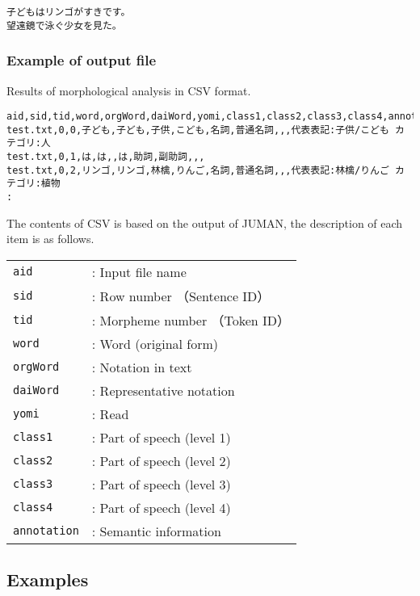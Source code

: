 \begin{Verbatim}[baselinestretch=0.7,frame=single]
子どもはリンゴがすきです。
望遠鏡で泳ぐ少女を見た。
\end{Verbatim}


\subsubsection*{Example of output file }
Results of morphological analysis in CSV format.


\begin{Verbatim}[baselinestretch=0.7,frame=single]
aid,sid,tid,word,orgWord,daiWord,yomi,class1,class2,class3,class4,annotation
test.txt,0,0,子ども,子ども,子供,こども,名詞,普通名詞,,,代表表記:子供/こども カテゴリ:人
test.txt,0,1,は,は,,は,助詞,副助詞,,,
test.txt,0,2,リンゴ,リンゴ,林檎,りんご,名詞,普通名詞,,,代表表記:林檎/りんご カテゴリ:植物
:
\end{Verbatim}
The contents of CSV is based on the output of JUMAN, the description of each item is as follows.  

\begin{table}[htbp]
{\small
\begin{tabular}{ll}
\verb|aid|        & : Input file name \\
\verb|sid|        & : Row number （Sentence ID） \\
\verb|tid|        & : Morpheme number （Token ID） \\
\verb|word|       & : Word (original form)   \\
\verb|orgWord|    & : Notation in text   \\
\verb|daiWord|    & : Representative notation   \\
\verb|yomi|       & : Read  \\
\verb|class1|     & : Part of speech (level 1)  \\
\verb|class2|     & : Part of speech (level 2)  \\
\verb|class3|     & : Part of speech (level 3)  \\
\verb|class4|     & : Part of speech (level 4)  \\
\verb|annotation| & : Semantic information  \\
\end{tabular} 
}
\end{table} 

\subsection{Examples}


%

